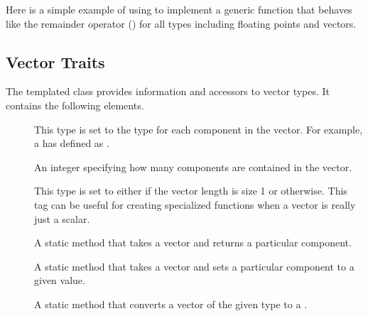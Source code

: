Here is a simple example of using  to implement a generic
function that behaves like the remainder operator (\textcode{\%}) for all
types including floating points and vectors.




\subsection{Vector Traits}

The  templated class provides information and
accessors to vector types. It contains the following elements.


\begin{description}
\item[]  This type is
  set to the type for each component in the vector. For example, a
   has  defined as .
\item[]  An integer
  specifying how many components are contained in the vector.
\item[] 
   
  This type is set to either  if the
  vector length is size 1 or 
  otherwise. This tag can be useful for creating specialized functions when
  a vector is really just a scalar.
\item[]  A static method that
  takes a vector and returns a particular component.
\item[]  A static method that
  takes a vector and sets a particular component to a given value.
\item[]  A static method that converts a
  vector of the given type to a .
\end{description}


